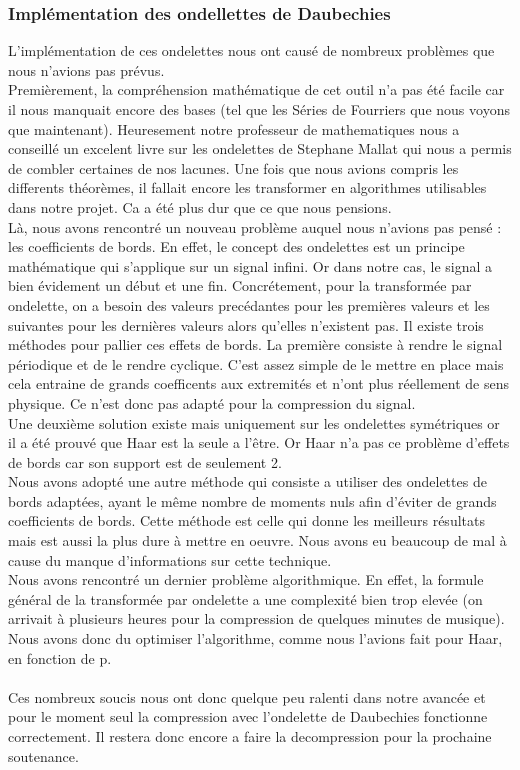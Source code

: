 \documentclass[a4paper,12pt]{article}
\begin{document}
\subsubsection{Implémentation des ondellettes de Daubechies}
L'implémentation de ces ondelettes nous ont causé de nombreux
problèmes que nous n'avions pas prévus.\\
Premièrement, la compréhension mathématique de cet outil n'a pas été
facile car il nous manquait encore des bases (tel que les Séries de
Fourriers que nous voyons que maintenant). Heuresement notre
professeur de mathematiques nous a conseillé un excelent livre sur les
ondelettes de Stephane Mallat qui nous a permis de combler certaines
de nos lacunes. Une fois que nous avions compris les differents
théorèmes, il fallait encore les transformer en algorithmes
utilisables
dans notre projet. Ca a été plus dur que ce que nous pensions.\\
Là, nous avons rencontré un nouveau problème auquel nous n'avions pas
pensé : les coefficients de bords. En effet, le concept des ondelettes
est un
principe mathématique qui s'applique sur un signal infini. Or dans
notre cas, le signal a bien évidement un début et une
fin. Concrétement, pour la transformée par ondelette, on a besoin des
valeurs precédantes pour les premières valeurs et les suivantes pour
les dernières valeurs alors qu'elles n'existent pas. Il existe trois
méthodes pour pallier ces effets de bords. La première consiste à
rendre le signal périodique et de le rendre cyclique. C'est assez
simple de le mettre en place mais cela entraine de grands coefficents
aux extremités et n'ont plus réellement de sens physique. Ce n'est
donc
pas adapté pour la compression du signal.\\
Une deuxième solution existe mais uniquement sur les ondelettes
symétriques or il a été prouvé que Haar est la seule a l'être. Or Haar
n'a pas ce problème d'effets de bords car son support est de seulement
2.\\
Nous avons adopté une autre méthode qui consiste a utiliser des
ondelettes de bords adaptées, ayant le même nombre de moments nuls
afin d'éviter de grands coefficients de bords. Cette méthode est celle
qui donne les meilleurs résultats mais est aussi la plus dure à mettre
en oeuvre. Nous avons eu beaucoup de mal à cause du manque
d'informations sur cette technique.\\
Nous avons rencontré un dernier problème algorithmique. En effet, la
formule général de la transformée par ondelette a une complexité bien
trop elevée (on arrivait à plusieurs heures pour la compression de
quelques minutes de musique). Nous avons donc du optimiser
l'algorithme, comme nous l'avions fait pour Haar, en fonction de
p.\\\\
Ces nombreux soucis nous ont donc quelque peu ralenti dans notre
avancée et pour le moment seul la compression avec l'ondelette de
Daubechies fonctionne correctement. Il restera donc encore a faire la
decompression pour la prochaine soutenance.
\end{document}

